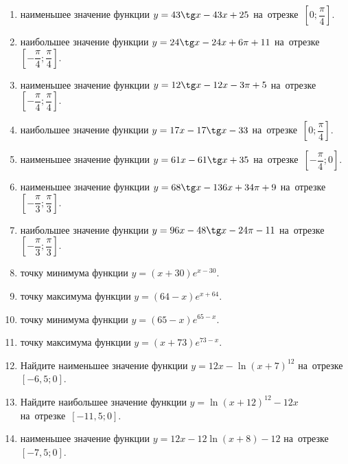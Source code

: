 \documentclass[a4paper,10pt]{article}
\begin{document}
\begin{enumerate}
\item {} наименьшее значение функции $y = 43\tg x-43x+25$ на~отрезке~$\left[0;\dfrac{\pi }{4}\right]$.

\item {} наибольшее значение функции $y=24\tg x-24x+6\pi +11$ на~отрезке~$\left[-\dfrac{\pi }{4};\dfrac{\pi }{4}\right]$.

\item {} наименьшее значение функции $y=12\tg x-12x-3\pi +5$ на~отрезке~$\left[-\dfrac{\pi }{4};\dfrac{\pi }{4}\right]$.

\item {} наибольшее значение функции $y = 17x-17\tg x -33$ на~отрезке~$\left[0;\dfrac{\pi }{4}\right]$.

\item {} наименьшее значение функции $y = 61x-61\tg x +35$ на~отрезке~$\left[-\dfrac{\pi }{4};0\right]$.

\item {} наименьшее значение функции $y = 68\tg x-136x+34 \pi +9$ на~отрезке~$\left[-\dfrac{\pi }{3};\dfrac{\pi }{3}\right]$.

\item {} наибольшее значение функции $y = 96x-48\tg x-24\pi -11$ на~отрезке~$\left[-\dfrac{\pi }{3};\dfrac{\pi }{3}\right]$.

\item {} точку минимума функции $y = \left(x+30\right)e^{x-30}$.

\item {} точку максимума функции $y = \left(64-x\right)e^{x+64}$.

\item {} точку минимума функции $y = \left(65-x\right)e^{65-x}$.

\item {} точку максимума функции $y = \left(x+73\right)e^{73-x}$.

\item Найдите наименьшее значение функции $y = 12x-\ln \left(x+7\right)^{12}$ на~отрезке~$\left[-6,5;0\right]$.

\item Найдите наибольшее значение функции $y = \ln \left(x+12\right)^{12}-12x$ на~отрезке~$\left[-11,5;0\right]$.

\item {} наименьшее значение функции $y = 12x-12\ln \left(x+8\right) -12$ на~отрезке~$\left[-7,5;0\right]$.


\end{enumerate}
\end{document}
